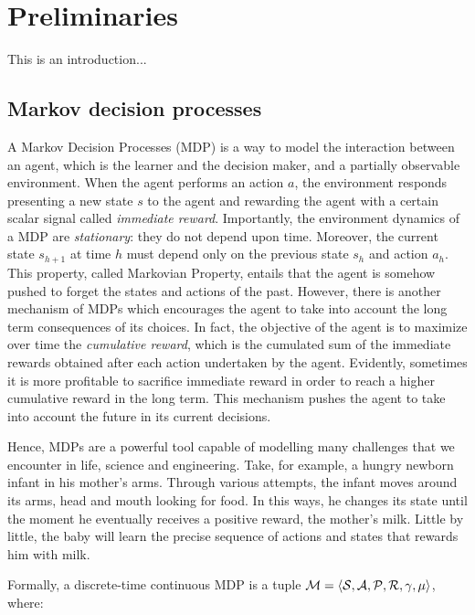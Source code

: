 
\chapter{Preliminaries}
This is an introduction...

\section{Markov decision processes}
A Markov Decision Processes (MDP) is a way to model the interaction between an agent, which is the learner and the decision maker, and a partially observable environment. When the agent performs an action $a$, the environment responds presenting a new state $s$ to the agent and rewarding the agent with a certain scalar signal called \emph{immediate reward}. Importantly, the environment dynamics of a MDP are \emph{stationary}: they do not depend upon time. Moreover, the current state $s_{h+1}$ at time $h$ must depend only on the previous state $s_{h}$ and action   $a_{h}$. This property, called Markovian Property, entails that the agent is somehow pushed to forget the states and actions of the past. However, there is another mechanism of MDPs which encourages the agent to take into account the long term consequences of its choices. In fact, the objective of the agent is to maximize over time the  \emph{cumulative reward}, which is the cumulated sum of the immediate rewards obtained after each action undertaken by the agent. Evidently, sometimes it is more profitable to sacrifice immediate reward in order to reach a higher cumulative reward in the long term. This mechanism pushes the agent to take into account the future in its current decisions. 

Hence, MDPs are a powerful tool capable of modelling many challenges that we encounter in life, science and engineering. Take, for example, a hungry newborn infant in his mother's arms. Through various attempts, the infant moves around its arms, head and mouth looking for food. In this ways, he changes its state until the moment he eventually receives a positive reward, the mother's milk. Little by little, the baby will learn the precise sequence of actions and states that rewards him with milk.

Formally, a discrete-time continuous MDP \cite{puterman2014markov} is a tuple $\mathcal{M} = \langle\mathcal{S},\mathcal{A},\mathcal{P},\mathcal{R},\gamma,\mu\rangle$, where:

